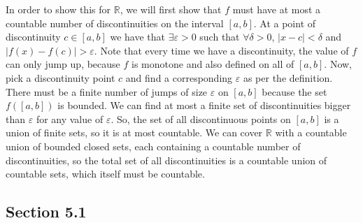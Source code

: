 \documentclass[11pt]{article}
\newcommand{\R}{\mathbb{R}}
\begin{document}
In order to show this for $\R$, we will first show that $f$ must have
at most a countable number of discontinuities on the interval
$[a,b]$.
At a point of discontinuity $c\in[a,b]$ we have that
$\exists\varepsilon>0$ such that $\forall\delta>0$,
$|x-c|<\delta$ and $|f(x)-f(c)|>\varepsilon$. Note that every time we have
a discontinuity, the value of $f$ can only jump up, because $f$ is
monotone and also defined on all of $[a,b]$.
Now, pick a discontinuity point $c$ and find a corresponding
$\varepsilon$ as per the definition. There must be a finite number of jumps
of size $\varepsilon$ on $[a,b]$ because the set $f([a,b])$ is bounded.
We can find at most a finite set of discontinuities bigger than
$\varepsilon$ for
any value of $\varepsilon$. So, the set of all discontinuous points on
$[a,b]$ is a union of finite sets, so it is at most countable.
We can cover $\R$ with a countable union of bounded closed sets,
each containing a countable number of discontinuities, so the total
set of all discontinuities is a countable union of countable sets,
which itself must be countable.


\subsection*{Section 5.1}
\end{document}

